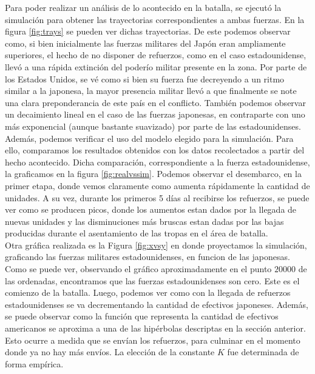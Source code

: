 \documentclass{sig-alternate}
\begin{document}
Para poder realizar un análisis de lo acontecido en la batalla, se ejecutó la simulación para obtener las 
trayectorias correspondientes a ambas fuerzas. En la figura \ref{fig:trays} se pueden ver dichas trayectorias. 
De este podemos observar como, si bien inicialmente las fuerzas militares del Japón eran ampliamente superiores, el hecho de no disponer de 
refuerzos, como en el caso estadounidense, llevó a una rápida extinción del poderío militar presente en la zona. Por parte de los 
Estados Unidos, se vé como si bien su fuerza fue decreyendo a un ritmo similar a la japonesa, la mayor presencia militar llevó a que finalmente
se note una clara preponderancia de este país en el conflicto. También podemos observar un decaimiento lineal en el caso de las fuerzas japonesas,
en contraparte con uno más exponencial (aunque bastante suavizado) por parte de las estadounidenses.\\
Además, podemos verificar el uso del modelo elegido para la simulación. Para ello, comparamos los resultados obtenidos con los datos 
recolectados a partir del hecho acontecido. Dicha comparación, correspondiente a la fuerza estadounidense, la graficamos en la figura 
\ref{fig:realvssim}.
Podemos observar el desembarco, en la primer etapa, donde vemos claramente como aumenta rápidamente la cantidad de unidades. A su vez, durante los primeros 5 días al recibirse los refuerzos, se
puede ver como se producen picos, donde los aumentos estan dados por la llegada de nuevas unidades y las disminuciones más bruscas estan dadas
por las bajas producidas durante el asentamiento de las tropas en el área de batalla.\\
Otra gráfica realizada es la Figura \ref{fig:xvsy} en donde proyectamos la simulación, graficando las fuerzas militares
estadounidenses, en funcion de las japonesas. Como se puede ver, observando el gráfico aproximadamente en el punto $20000$ de las ordenadas,
encontramos que las fuerzas estadounidenses son cero. Este es el comienzo de la batalla. Luego, podemos ver como con la llegada de refuerzos 
estadounidenses se va decrementando la cantidad de efectivos japoneses. Además, se puede observar como la función que representa la cantidad de
efectivos americanos se aproxima a una de las hipérbolas descriptas en la sección anterior. Esto ocurre a medida que se envían los refuerzos,
para culminar en el momento donde ya no hay más envíos. La elección de la constante $K$ fue determinada de forma empírica.
\end{document}
